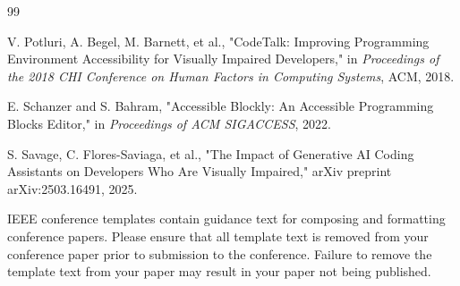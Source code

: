 \documentclass[conference]{IEEEtran}
\begin{document}
\begin{thebibliography}{99}

V. Potluri, A. Begel, M. Barnett, et al.,
"CodeTalk: Improving Programming Environment Accessibility for Visually Impaired Developers,"
in \textit{Proceedings of the 2018 CHI Conference on Human Factors in Computing Systems}, ACM, 2018.

E. Schanzer and S. Bahram,
"Accessible Blockly: An Accessible Programming Blocks Editor,"
in \textit{Proceedings of ACM SIGACCESS}, 2022.

S. Savage, C. Flores-Saviaga, et al.,
"The Impact of Generative AI Coding Assistants on Developers Who Are Visually Impaired,"
arXiv preprint arXiv:2503.16491, 2025.

\end{thebibliography}


\vspace{12pt}
\color{red}
IEEE conference templates contain guidance text for composing and formatting conference papers. Please ensure that all template text is removed from your conference paper prior to submission to the conference. Failure to remove the template text from your paper may result in your paper not being published.
\end{document}
